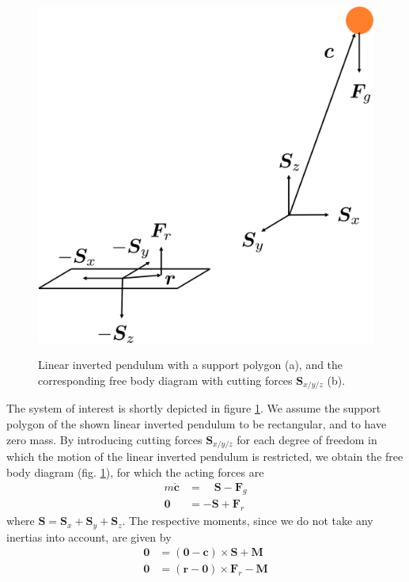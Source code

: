 \begin{figure}[h!]
	[.4\linewidth]{\includegraphics[scale=.3]{chapters/02_foundations_for_humanoid_walking/img/inverted_pendulum_free_body_diagram.png}}
	\caption{Linear inverted pendulum with a support polygon (a), and the corresponding free body diagram with cutting forces $\bm{S}_{x/y/z}$ (b).}
	\label{fig::21_lip}
\end{figure}
The system of interest is shortly depicted in figure \ref{fig::21_lip}. We assume the support polygon of the shown linear inverted pendulum to be rectangular, and to have zero mass. By introducing cutting forces $\bm{S}_{x/y/z}$ for each degree of freedom in which the motion of the linear inverted pendulum is restricted, we obtain the free body diagram (fig. \ref{fig::21_lip}), for which the acting forces are
\begin{align}
	m\ddot{\bm{c}} &=\quad\bm{S} - \bm{F}_g 
	\label{eq::21_pendulum_force} \\
	\bm{0} &= -\bm{S}+\bm{F}_r
	\label{eq::21_support_polygon_force}
\end{align}
where $\bm{S}=\bm{S}_x+\bm{S}_y+\bm{S}_z$. The respective moments, since we do not take any inertias into account, are given by
\begin{align}
	\bm{0} &= (\bm{0}-\bm{c})\times\bm{S} + \bm{M} 
	\label{eq::21_pendulum_moment}\\	
	\bm{0} &= (\bm{r}-\bm{0})\times\bm{F}_r - \bm{M}
	\label{eq::21_support_polygon_moment}	
\end{align}

